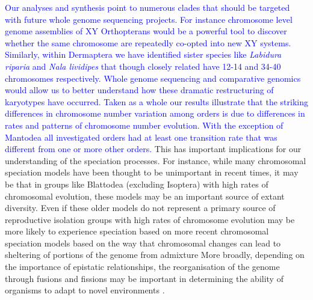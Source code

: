 \documentclass[]{rsos}%
\begin{document}
\textcolor{blue}{Our analyses and synthesis point to numerous clades that should be targeted with future whole genome sequencing projects. 
For instance chromosome level genome assemblies of XY Orthopterans would be a powerful tool to discover whether the same chromosome are repeatedly co-opted into new XY systems.
Similarly, within Dermaptera we have identified sister species like \textit{Labidura riparia} and \textit{Nala lividipes} that though closely related have 12-14 and 34-40 chromosomes respectively. 
Whole genome sequencing and comparative genomics would allow us to better understand how these dramatic restructuring of karyotypes have occurred.
Taken as a whole our results illustrate that the striking differences in chromosome number variation among orders is due to differences in rates and patterns of chromosome number evolution.
With the exception of Mantodea all investigated orders had at least one transition rate that was different from one or more other orders.} 
This has important implications for our understanding of the speciation processes.
For instance, while many chromosomal speciation models \cite{baker1986, white} have been thought to be unimportant in recent times, it may be that in groups like Blattodea (excluding Isoptera) with high rates of chromosomal evolution, these models may be an important source of extant diversity.
Even if these older models do not represent a primary source of reproductive isolation groups with high rates of chromosome evolution may be more likely to experience speciation based on more recent chromosomal speciation models based on the way that chromosomal changes can lead to sheltering of portions of the genome from admixture \cite{rieseberg2001} 
More broadly, depending on the importance of epistatic relationships, the reorganisation of the genome through fusions and fissions may be important in determining the ability of organisms to adapt to novel environments \cite{stebbins1971}.
\newpage
\end{document}
